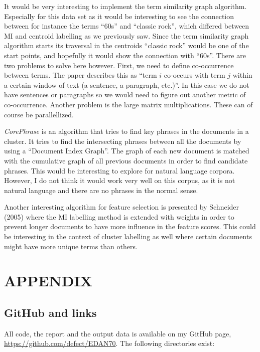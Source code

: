 \documentclass[letterpaper, 10 pt, conference]{ieeeconf}
\begin{document}
It would be very interesting to implement the term similarity graph algorithm.
Especially for this data set as it would be interesting to see the connection
between for instance the terms ``60s'' and ``classic rock'', which differed
between MI and centroid labelling as we previously saw. Since the term
similarity graph algorithm starts its traversal in the centroids ``classic
rock'' would be one of the start points, and hopefully it would show the
connection with ``60s''. There are two problems to solve here however. First, we
need to define co-occurrence between terms. The paper describes this as
``term $i$ co-occurs with term $j$ within a certain window of text (a sentence,
a paragraph, etc.)''. In this case we do not have sentences or paragraphs so we
would need to figure out another metric of co-occurrence. Another problem is the
large matrix multiplications. These can of course be parallellized.

\textit{CorePhrase} is an algorithm that tries to find key phrases in the
documents in a cluster. It tries to find the intersecting phrases between all
the documents by using a ``Document Index Graph''. The graph of each new
document is matched with the cumulative graph of all previous documents in order
to find candidate phrases.\cite{CorePhrase} This would be interesting to explore
for natural language corpora. However, I do not think it would work very well on
this corpus, as it is not natural language and there are no phrases in the
normal sense.

Another interesting algorithm for feature selection is presented by Schneider
(2005) where the MI labelling method is extended with weights in order to
prevent longer documents to have more influence in the feature
scores.\cite{schneider2005weighted} This could be interesting in the context of
cluster labelling as well where certain documents might have more unique terms
than others.

\addtolength{\textheight}{-12cm}

\section*{APPENDIX}

\subsection{GitHub and links}
All code, the report and the output data is available on my GitHub page,
\url{https://github.com/defect/EDAN70}. The following directories exist:
\end{document}
